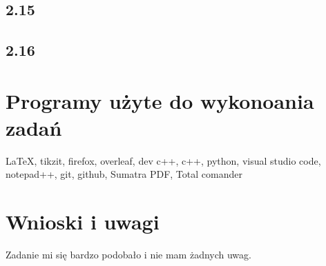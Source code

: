 \documentclass[a4paper,twoside,7pt]{book}
\begin{document}
\newpage
\begin{multicols}{2}
\hspace{0.4cm}
\begin{minipage}{3cm}
\subsection*{2.15}
  
\end{minipage}

\subsection*{2.16}
   
\end{multicols}




\section{Programy użyte do wykonoania zadań}  
\LaTeX, tikzit, firefox, overleaf, dev c++, c++, python, visual studio code, notepad++, git, github, Sumatra PDF, Total comander  
\section{Wnioski i uwagi} 
\begin{center}
 \large{Zadanie mi się bardzo podobało i nie mam żadnych uwag.}   
\end{center}
 
\end{document}

